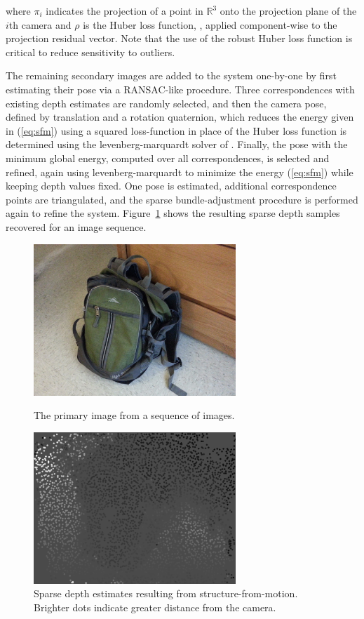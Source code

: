 \documentclass[conference]{acmsiggraph}
\begin{document}
where $\pi_i$ indicates the projection of a point in $\mathbb{R}^3$ onto
the projection plane of the $i$th camera and
$\rho$ is the Huber loss function, \cite{huber1964robust}, applied component-wise
to the projection residual vector.  Note that the use of the robust Huber loss
function is critical to reduce sensitivity to outliers.

The remaining secondary images are added to the system one-by-one
by first estimating their pose via a RANSAC-like procedure.
Three correspondences with existing depth estimates are randomly selected,
and then the camera pose, defined by translation and a rotation quaternion,
which reduces the energy given in (\ref{eq:sfm}) using a squared loss-function
in place of the Huber loss function is determined using the levenberg-marquardt
solver of \cite{ceres-solver}.  Finally, the pose with the minimum global
energy, computed over all correspondences, is selected and refined,
again using levenberg-marquardt to minimize the energy (\ref{eq:sfm}) while
keeping depth values fixed.  
One pose is estimated, additional correspondence points are triangulated,
and the sparse bundle-adjustment procedure is performed again to refine
the system.  Figure~\ref{fig:initial_depth} shows the resulting sparse depth
samples recovered for an image sequence.

\begin{figure}[ht]
  \centering
  \includegraphics[width=3in]{images/backpack}
  \caption{The primary image from a sequence of images.}
  \includegraphics[width=3in]{images/initial_depth}
  \caption{Sparse depth estimates resulting from structure-from-motion. Brighter
  dots indicate greater distance from the camera.}
  \label{fig:initial_depth}
\end{figure}
\end{document}
